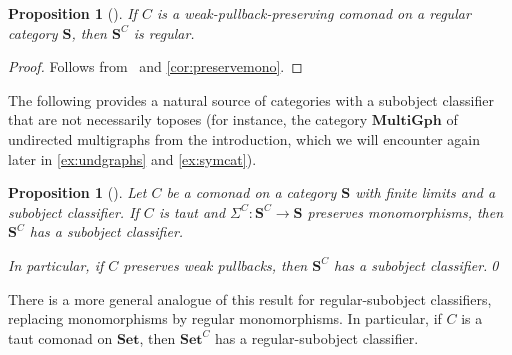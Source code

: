 \documentclass[11pt, oneside, article]{memoir}
\theoremstyle{plain}
\newtheorem{proposition}[theorem]{Proposition}
\theoremstyle{definition}
\theoremstyle{remark}
\newenvironment{remark}
{\renewcommand\qedsymbol{$\lrcorner$}%
  \pushQED{\qed}\myremark}
{\popQED\endmyremark}
\newcommand{\namedcat}[1]{\mathbf{#1}}
\newcommand{\cat}[1]{\mathbf{#1}}
\newcommand{\Set}{\namedcat{Set}}
\newcommand{\MultiGph}{\namedcat{MultiGph}}
\newcommand{\CoalgOn}[2]{{#2}^{#1}}
\newcommand{\CoalgSet}[1]{\CoalgOn{#1}{\Set}}
\newcommand{\CoalgS}[1]{\CoalgOn{#1}{\bS}}
\newcommand{\carr}{\Sigma}
\newcommand{\car}[1]{\carr^{#1}}
\newcommand{\carC}{\car{\cC}}
\newcommand{\cmnd}[1]{{#1}}
\newcommand{\cC}{\cmnd{C}}
\newcommand{\bS}{\cat{S}}
\newcommand{\CSet}{\CoalgSet{\cC}}
\newcommand{\CS}{\CoalgS{\cC}}
\begin{document}
\begin{proposition}[{\cite{johnstone-power-tsujishita-watanabe-worrell}}]\label{prop:regular}
  If $\cC$ is a weak-pullback-preserving comonad on a regular category
  $\bS$, then $\CS$ is regular.
\end{proposition}
\begin{proof}
  Follows from~\cite[Lemma 3.9]{johnstone-power-tsujishita-watanabe-worrell} and
  \cref{cor:preservemono}.
\end{proof}

The following provides a natural source of categories with a subobject
classifier that are not necessarily toposes (for instance, the
category $\MultiGph$ of undirected multigraphs from the introduction,
which we will encounter again later in \cref{ex:undgraphs} and
\cref{ex:symcat}).

\begin{proposition}[{\cite[Proposition 3.6]{johnstone-power-tsujishita-watanabe-worrell}}]\label{prop:classifier}
  Let $\cC$ be a comonad on a category $\bS$ with finite limits and a
  subobject classifier. If $\cC$ is taut and
  $\carC \colon \CS \to \bS$ preserves monomorphisms, then $\CS$ has a
  subobject classifier.

  In particular, if $\cC$ preserves weak pullbacks, then $\CS$ has a
  subobject classifier.\qed
\end{proposition}

\begin{remark}
  There is a more general analogue of this result for
  regular-subobject classifiers, replacing monomorphisms by regular
  monomorphisms. In particular, if $\cC$ is a taut comonad on $\Set$,
  then $\CSet$ has a regular-subobject classifier.
\end{remark}
\end{document}
